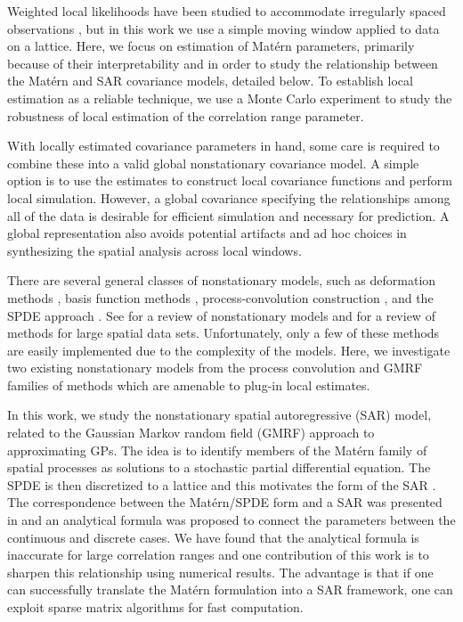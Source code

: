 \documentclass[review]{elsarticle}
\begin{document}
Weighted local likelihoods have been studied to accommodate irregularly spaced observations \cite{anderes2011local}, but in this work we use a simple moving window applied to data on a lattice. Here, we focus on estimation of Mat\'ern parameters, primarily because of their interpretability and in order to study the relationship between the Mat\'ern and SAR covariance models, detailed below. To establish local estimation as a reliable technique, we use a Monte Carlo experiment to study the robustness of local estimation of the correlation range parameter. 

With locally estimated covariance parameters in hand, some care is required to combine these into a valid global nonstationary covariance model. A simple option is to use the estimates to construct local covariance functions and perform local simulation. However, a global covariance specifying the relationships among all of the data is desirable for efficient simulation and necessary for prediction. A global representation also avoids potential artifacts and ad hoc choices in synthesizing the spatial analysis across local windows.



There are several general classes of nonstationary models, such as deformation methods \cite{sampsonguttorp, anderes2008estimating}, basis function methods \cite{cressie2008fixed, katzfuss2011spatio, nychka2015multiresolution, nychka2002multiresolution}, process-convolution construction \cite{higdon1998process, higdon1999non, higdon2002space, paciorek2004nonstationary, fuentes2001new, fuentes2002spectral, zhu2010estimation}, and the SPDE approach \cite{lindgren2011explicit, lindgren2007explicit, simpson2012think, rue2005gaussian}. See \cite{risser2016nonstationary} for a review of nonstationary models and \cite{heaton2017methods} for a review of methods for large spatial data sets. Unfortunately, only a few of these methods are easily implemented due to the complexity of the models. Here, we investigate two existing nonstationary models from the process convolution and GMRF families of methods which are amenable to plug-in local estimates.

In this work, we study the nonstationary spatial autoregressive (SAR) model, related to the Gaussian Markov random field (GMRF) approach to approximating GPs. The idea is to identify members of the Mat\'ern family of spatial processes as solutions to a stochastic partial differential equation. The SPDE is then discretized to a lattice and this motivates the form of the SAR \cite{lindgren2011explicit}. The correspondence between the Mat\'ern/SPDE form and a SAR was presented in \cite{lindgren2011explicit} and an analytical formula was proposed to connect the parameters between the continuous and discrete cases. We have found that the analytical formula is inaccurate for large correlation ranges and one contribution of this work is to sharpen this relationship using numerical results. The advantage is that if one can successfully translate the Mat\'ern formulation into a SAR framework, one can exploit sparse matrix algorithms for fast computation.
\end{document}
